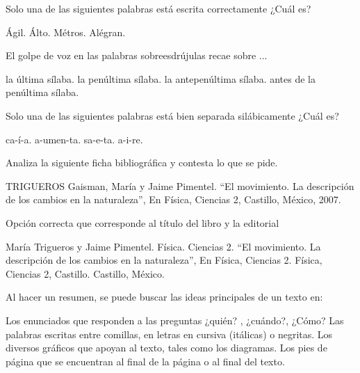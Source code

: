 \documentclass[12pt]{exam}
\begin{document}
\begin{questions}
    \question Solo una de las siguientes palabras está escrita correctamente ¿Cuál es?
    \\[1em]
    \begin{oneparchoices}
        \choice Ágil.
        \choice Álto.
        \choice Métros.
        \choice Alégran.
    \end{oneparchoices}

    \question El golpe de voz en las palabras sobreesdrújulas recae sobre ...
    \\[1em]
    \begin{oneparchoices}
        \choice la última sílaba.
        \choice la penúltima sílaba.
        \choice la antepenúltima sílaba.
        \choice antes de la penúltima sílaba.
    \end{oneparchoices}

    \question Solo una de las siguientes palabras está bien separada silábicamente ¿Cuál es?
    \\[1em]
    \begin{oneparchoices}
        \choice ca-í-a.
        \choice a-umen-ta.
        \choice sa-e-ta.
        \choice a-i-re.
    \end{oneparchoices}

    \newpage
    
    Analiza la siguiente ficha bibliográfica y contesta lo que se pide.
    
  
    TRIGUEROS Gaisman, María y Jaime Pimentel. \enquote{El movimiento. La descripción de los cambios en la naturaleza}, En Física, Ciencias 2, Castillo, México, 2007.

    \question Opción correcta que corresponde al título del libro y la editorial
    
    \begin{choices}
        \choice María Trigueros y Jaime Pimentel. Física. Ciencias 2.
        \choice \enquote{El movimiento. La descripción de los cambios en la naturaleza}, En Física, Ciencias 2.
        \choice Física, Ciencias 2, Castillo.
        \choice Castillo, México.
    \end{choices}

    \question Al hacer un resumen, se puede buscar las ideas principales de un texto en:
    \begin{choices}
    \choice Los enunciados que responden a las preguntas ¿quién? , ¿cuándo?, ¿Cómo?
    \choice Las palabras escritas entre comillas, en letras en cursiva (itálicas) o negritas.
    \choice Los diversos gráficos que apoyan al texto, tales como los diagramas.
    \choice Los pies de página que se encuentran al final de la página o al final del texto.
    \end{choices}


\end{questions}
\end{document}
